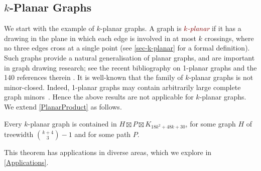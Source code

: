 \documentclass{patmorin}
\newcommand{\defin}[1]{\textcolor{Maroon}{\emph{#1}}}
\newcommand{\note}[2]{\noindent{\color{red}[#1:~#2]}}
\newcommand{\referee}[2]{\noindent\textcolor{blue}{\framebox{\begin{minipage}{\textwidth} Ref \#{#1}: #2\end{minipage}}}}
\begin{document}
\subsection{$k$-Planar Graphs}
\label{k_planar_section}

We start with the example of $k$-planar graphs. A graph is \defin{$k$-planar} if it has a drawing in the plane in which each edge is involved in at most $k$ crossings, where no three edges cross at a single point (see \cref{sec-k-planar} for a formal definition). Such graphs provide a natural generalisation of planar graphs, and are important in graph drawing research; see the recent bibliography on 1-planar graphs and the 140 references therein \citep{kobourov.liotta.ea:annotated}. It is well-known that the family of $k$-planar graphs is not minor-closed.  Indeed, 1-planar graphs may contain arbitrarily large complete graph minors~\citep{dujmovic.eppstein.ea:structure}. Hence the above results are not applicable for  $k$-planar graphs. We extend \cref{PlanarProduct} as follows.

\begin{thm}
\label{kPlanarProduct}
Every $k$-planar graph is contained in $H\boxtimes P\boxtimes K_{18k^2+48k+30}$, for some graph $H$ of treewidth $\binom{k+4}{3}-1$ and for some path $P$.
\end{thm}

This theorem has applications in diverse areas, which we explore in \cref{Applications}.

%
%
%
\end{document}
